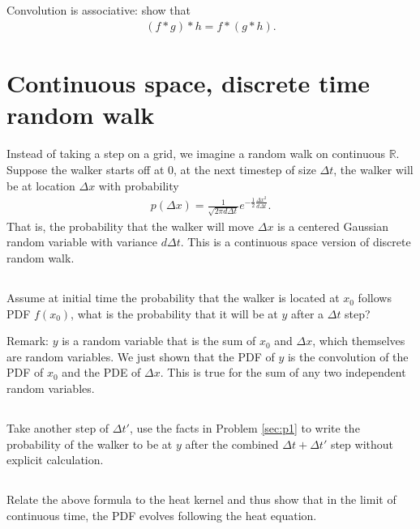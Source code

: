 \documentclass[11pt,letterpaper]{report}
\begin{document}
\subsection{}
Convolution is associative: show that
\begin{align}
    (f*g)*h = f*(g*h).
\end{align}

\section{Continuous space, discrete time random walk}
Instead of taking a step on a grid, we imagine a random walk on continuous $\mathbb{R}$. Suppose the walker starts off at $0$, at the next timestep of size $\Delta t$, the walker will be at location $\Delta x$ with probability
\begin{align}
    p(\Delta x) = \frac{1}{ \sqrt{2\pi d\Delta t} } e^{-\frac{1}{2}\frac{\Delta x^2}{d\Delta t}}.
\end{align}
That is, the probability that the walker will move $\Delta x$ is a centered Gaussian random variable with variance $d\Delta t$. This is a continuous space version of discrete random walk.

\subsection{}
Assume at initial time the probability that the walker is located at $x_0$ follows PDF $f(x_0)$, what is the probability that it will be at $y$ after a $\Delta t$ step?

Remark: $y$ is a random variable that is the sum of $x_0$ and $\Delta x$, which themselves are random variables. We just shown that the PDF of $y$ is the convolution of the PDF of $x_0$ and the PDE of $\Delta x$. This is true for the sum of any two independent random variables.

\subsection{}
Take another step of $\Delta t'$, use the facts in Problem \ref{sec:p1} to write the probability of the walker to be at $y$ after the combined $\Delta t+\Delta t'$ step without explicit calculation.

\subsection{}
Relate the above formula to the heat kernel and thus show that in the limit of continuous time, the PDF evolves following the heat equation.
\end{document}

